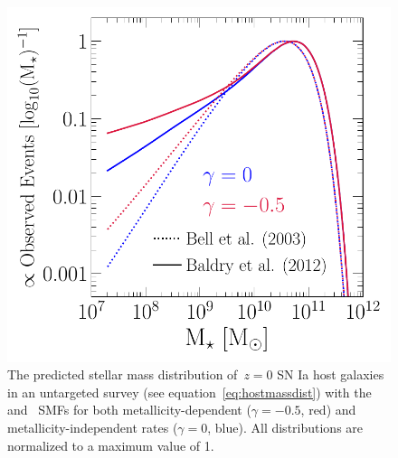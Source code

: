 \documentclass[ms.tex]{subfiles}
\begin{document}
\begin{figure}
\centering
\includegraphics[scale = 0.55]{ia_massdist.pdf}
\caption{
The predicted stellar mass distribution of~$z = 0$ SN Ia host galaxies in an
untargeted survey (see equation~\ref{eq:hostmassdist}) with the
\citet[][dotted]{Bell2003} and~\citet[][solid]{Baldry2012} SMFs for both
metallicity-dependent ($\gamma = -0.5$, red) and metallicity-independent rates
($\gamma = 0$, blue).
All distributions are normalized to a maximum value of 1.
}
\label{fig:hostmassdist}
\end{figure}
\end{document}
